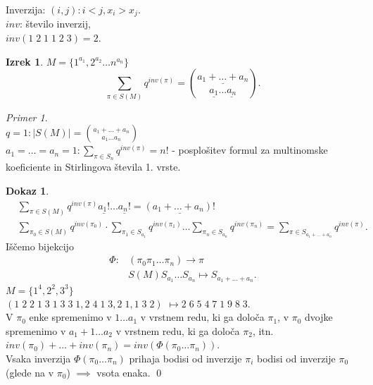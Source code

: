 \documentclass[a4paper, 12pt]{book}
\theoremstyle{definition}
\newtheorem{theorem}[counter]{Izrek}
\newtheorem{pro}[counter]{Dokaz}
\theoremstyle{remark}
\newtheorem*{ex}{Primer}
\begin{document}
Inverzija: $(i,j): i < j, x_i > x_j$. \\
$inv$: število inverzij, \\
$inv(1 \; 2 \; 1 \; 1 \; 2 \; 3) = 2$.
\begin{theorem}
  $M = \{1^{a_1}, 2^{a_2} \dots n^{a_n}\}$
  \begin{equation*}
    \sum_{\pi \in S(M)} q^{inv(\pi)} = \binom{\underline{a_1 + \dots + a_n}}{\underline{a_1} \dots \underline{a_n}}.
  \end{equation*}
\end{theorem}
\begin{ex} \text{} \\
  $q = 1: |S(M)| = \binom{a_1 + \dots + a_n}{a_1 \dots a_n}$ \\
  $a_1 = \dots = a_n = 1: \sum_{\pi \in S_n} q^{inv(\pi)} = n!$ - posplošitev formul za multinomske koeficiente
  in Stirlingova števila 1. vrste.
\end{ex}
\begin{pro}
  \begin{align*}
    &\sum_{\pi \in S(M)} q^{inv(\pi)} \underline{a_1!} \dots \underline{a_n!} = \underline{(a_1 + \dots + a_n)!} \\
    &\sum_{\pi_0 \in S(M)} q^{inv(\pi_0)} \cdot \sum_{\pi_1 \in S_{a_1}} q^{inv(\pi_1)} \dots
      \sum_{\pi_n \in S_{a_n}} q^{inv(\pi_n)} = \sum_{\pi \in S_{a_1 + \dots + a_n}} q^{inv(\pi)}.
  \end{align*}
  Iščemo bijekcijo
  \begin{align*}
    \Phi: &(\pi_0 \pi_1 \dots \pi_n) \to \pi \\
    &S(M) S_{a_1} \dots S_{a_n} \mapsto S_{a_1 + \dots + a_n}.
  \end{align*}
  $M = \{1^4, 2^2, 3^3\}$ \\
  $(1 \; 2 \; 2 \; 1 \; 3 \; 1 \; 3 \; 3 \; 1, 2 \; 4 \; 1 \; 3, 2 \; 1, 1 \; 3 \; 2)$
  $\mapsto 2 \; 6 \; 5 \; 4 \; 7 \; 1 \; 9 \; 8 \; 3$. \\
  V $\pi_0$ enke spremenimo v $1 \dots a_1$ v vrstnem redu, ki ga določa $\pi_1$,
  v $\pi_0$ dvojke spremenimo v $a_1+1 \dots a_2$ v vrstnem redu, ki ga določa $\pi_2$, itn. \\
  $inv(\pi_0) + \dots + inv(\pi_n) = inv(\Phi(\pi_0 \dots \pi_n))$. \\
  Vsaka inverzija $\Phi(\pi_0 \dots \pi_n)$ prihaja bodisi od inverzije $\pi_i$ bodisi od inverzije $\pi_0$
  (glede na  v $\pi_0$) $\implies$ vsota enaka.
  \qed
\end{pro}
\end{document}
